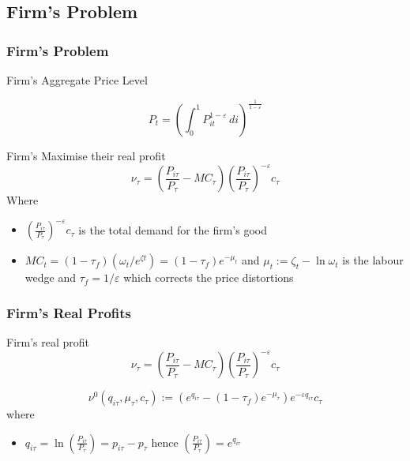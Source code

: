 \documentclass{beamer}
\begin{document}
\subsection{Firm's Problem}

\subsubsection{Firm's Problem}
\begin{frame}{\subsecname}
Firm's Aggregate Price Level

\begin{equation}\tag{13}
    P_{t}=\left(\int_{0}^{1}P_{it}^{1-\varepsilon}\,di\right)^{\frac{1}{1-\varepsilon}}
\end{equation}

Firm's Maximise their real profit
\begin{equation*}
    \nu_{\tau} = \left(\frac{P_{i\tau}}{P_{\tau}}-MC_{\tau}\right)\left(\frac{P_{i\tau}}{P_{\tau}}\right)^{-\varepsilon} c_{\tau}
\end{equation*}
Where
\begin{itemize}
\item    $\left(\frac{P_{i\tau}}{P_{\tau}}\right)^{-\varepsilon} c_{\tau}$ is the total demand for the firm's good 
\item $MC_{t}=(1-\tau_{f})(\omega_{t}/e^{\zeta{t}})=(1-\tau_{f})e^{-\mu_{t}}$ and $\mu_{t} :=\zeta_{t}- \ln \omega_{t}$ is the labour wedge and $\tau_{f}= 1/\varepsilon$ which corrects the price distortions
\end{itemize}
 
    

\end{frame}
\subsubsection{Firm's Real Profits}
\begin{frame}{\subsecname}
Firm's real profit
\begin{equation*}
    \nu_{\tau} = \left(\frac{P_{i\tau}}{P_{\tau}}-MC_{\tau}\right)\left(\frac{P_{i\tau}}{P_{\tau}}\right)^{-\varepsilon} c_{\tau}
\end{equation*}

\begin{equation}\tag{14}
    \nu^{0}(q_{i\tau},\mu_{\tau},c_{\tau}):=\left(e^{q_{i\tau}}-(1-\tau_{f})e^{-\mu_{\tau}}\right)e^{-\varepsilon q_{i\tau}}c_{\tau}
\end{equation} where 
\begin{itemize}
    \item  $q_{i\tau}=\ln\left(\frac{P_{i\tau}}{P_{\tau}}\right)= p_{i\tau}-p_{\tau}$ hence $\left(\frac{P_{i\tau}}{P_{\tau}}\right)= e^{q_{i\tau}}$
\end{itemize}


\end{frame}
\end{document}

